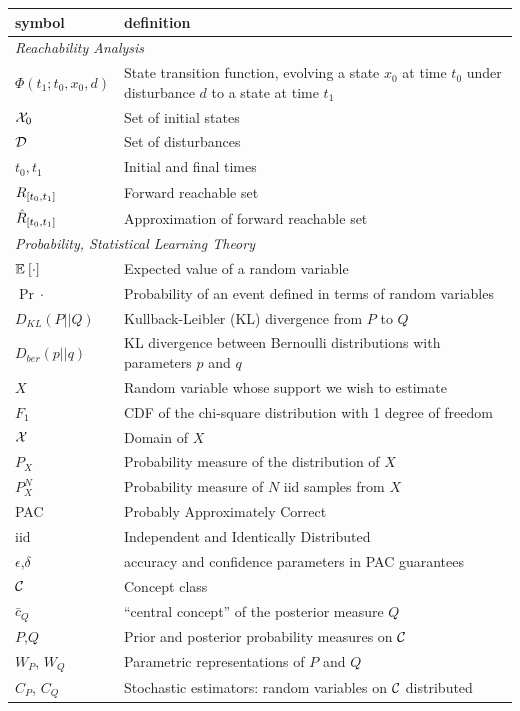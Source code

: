 \documentclass[onefignum,onetabnum]{siamart171218}
\begin{document}
\begin{tabular}{p{}p{}}
\toprule
symbol & definition \\
\midrule
%
%
\multicolumn{2}{l}{
\emph{Reachability Analysis}
} \\
$\Phi(t_1;t_0,x_0,d)$ & State transition function, evolving a state
$x_0$ at time $t_0$ under disturbance $d$ to a state at time $t_1$\\
$\mathcal{X}_0$ & Set of initial states\\
$\mathcal{D}$ & Set of disturbances\\
$t_0,t_1$ & Initial and final times\\
$R_{[t_0,t_1]}$ &  Forward reachable set\\
$\hat{R}_{[t_0,t_1]}$ & Approximation of forward reachable set\\
%
%
\midrule
\multicolumn{2}{l}{
\emph{Probability, Statistical Learning Theory}
} \\
$\mathbb{E}_{ }\left[\cdot\right]$ & Expected value of a random variable\\
$\Pr{\cdot}$ & Probability of an event defined in terms of random variables\\
$D_{KL}(P||Q)$ & Kullback-Leibler (KL) divergence from $P$ to $Q$ \\
$D_{ber}(p||q)$ & KL divergence between Bernoulli
distributions with parameters $p$ and $q$ \\
$X$ & Random variable whose support we wish to estimate\\
$F_1$ & CDF of the chi-square distribution with 1 degree of freedom\\
$\mathcal{X}$ & Domain of $X$ \\
$P_X$ & Probability measure of the distribution of $X$\\
$P_X^N$ & Probability measure of $N$ iid samples from $X$\\
PAC & Probably Approximately Correct\\
iid & Independent and Identically Distributed\\
$\epsilon$,$\delta$ & accuracy and confidence parameters in PAC guarantees\\
$\mathcal{C}$ & Concept class \\
$\bar{c}_Q$ & ``central concept'' of the posterior measure $Q$ \\
$P$,$Q$ & Prior and posterior probability measures on $\mathcal{C}$\\
$W_P$, $W_Q$ & Parametric representations of $P$ and $Q$\\
$C_P$, $C_Q$ & Stochastic estimators: random variables on $\mathcal{C}$ distributed

\end{tabular}
\end{document}
